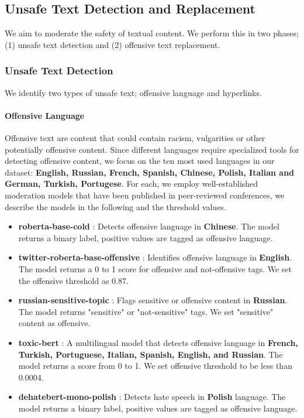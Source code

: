 \subsection{Unsafe Text Detection and Replacement}

We aim to moderate the safety of textual content. We perform this in two phases; (1) unsafe text detection and (2) offensive text replacement.

\subsubsection{Unsafe Text Detection}
We identify two types of unsafe text; offensive language and hyperlinks. 

\paragraph{Offensive Language}
Offensive text are content that could contain racism, vulgarities or other potentially offensive content. Since different languages require specialized tools for detecting offensive content, we focus on the ten most used languages in our dataset: \textbf{English, Russian, French, Spanish, Chinese, Polish, Italian and German, Turkish, Portugese}. For each, we employ well-established moderation models that have been published in peer-reviewed conferences, we describe the models in the following and the threshold values.

\begin{itemize}
    \item \textbf{roberta-base-cold} \cite{chinese-moderate}: Detects offensive language in \textbf{Chinese}. The model returns a binary label, positive values are tagged as offensive language.
    \item \textbf{twitter-roberta-base-offensive} \cite{en-moderation}: Identifies offensive language in \textbf{English}. The model returns a 0 to 1 score for offensive and not-offensive tags. We set the offensive threshold as 0.87.
    \item \textbf{russian-sensitive-topic} \cite{russian-content-moderation}: Flags sensitive or offensive content in \textbf{Russian}. The model returns "sensitive" or "not-sensitive" tags. We set "sensitive" content as offensive.
    \item \textbf{toxic-bert} \cite{multi-content-moderation}: A multilingual model that detects offensive language in \textbf{French, Turkish, Portuguese, Italian, Spanish, English, and Russian}. The model returns a score from 0 to 1. We set offensive threshold to be less than 0.0004.
    \item \textbf{dehatebert-mono-polish} \cite{aluru2020deep}: Detects hate speech in \textbf{Polish} language. The model returns a binary label, positive values are tagged as offensive language.
\end{itemize}


